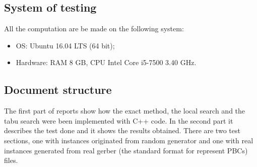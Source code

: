 	\subsection{System of testing}
		All the computation are be made on the following system:
		\begin{itemize}
			\item OS: Ubuntu 16.04 LTS (64 bit);
			\item Hardware: RAM 8 GB, CPU Intel Core i5-7500 3.40 GHz.
		\end{itemize}
	
	\subsection{Document structure}
		The first part of reports show how the exact method, the local search and the tabu search were been implemented with C++ code. In the second part it describes the test done and it shows the results obtained. There are two test sections, one with instances originated from random generator and one with real instances generated from real gerber (the standard format for represent PBCs) files.